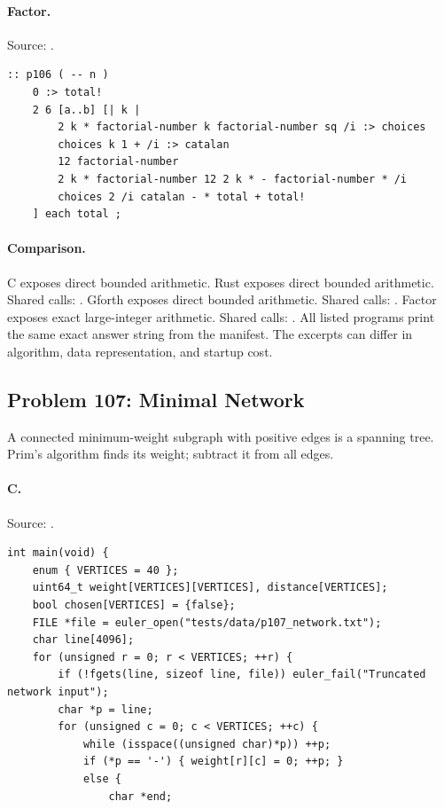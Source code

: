 \paragraph{Factor.} Source: .
\begin{lstlisting}
:: p106 ( -- n )
    0 :> total!
    2 6 [a..b] [| k |
        2 k * factorial-number k factorial-number sq /i :> choices
        choices k 1 + /i :> catalan
        12 factorial-number
        2 k * factorial-number 12 2 k * - factorial-number * /i
        choices 2 /i catalan - * total + total!
    ] each total ;
\end{lstlisting}

\paragraph{Comparison.}
C exposes direct bounded arithmetic. Rust exposes direct bounded arithmetic. Shared calls: \texttt{}. Gforth exposes direct bounded arithmetic. Shared calls: \texttt{}. Factor exposes exact large-integer arithmetic. Shared calls: \texttt{}.
All listed programs print the same exact answer string from the manifest. The excerpts can differ in algorithm, data representation, and startup cost.

\subsection{Problem 107: Minimal Network}
\label{walkthrough:p107}
A connected minimum-weight subgraph with positive edges is a spanning tree. Prim's algorithm finds its weight; subtract it from all edges.

\paragraph{C.} Source: .
\begin{lstlisting}
int main(void) {
    enum { VERTICES = 40 };
    uint64_t weight[VERTICES][VERTICES], distance[VERTICES];
    bool chosen[VERTICES] = {false};
    FILE *file = euler_open("tests/data/p107_network.txt");
    char line[4096];
    for (unsigned r = 0; r < VERTICES; ++r) {
        if (!fgets(line, sizeof line, file)) euler_fail("Truncated network input");
        char *p = line;
        for (unsigned c = 0; c < VERTICES; ++c) {
            while (isspace((unsigned char)*p)) ++p;
            if (*p == '-') { weight[r][c] = 0; ++p; }
            else {
                char *end;
\end{lstlisting}

